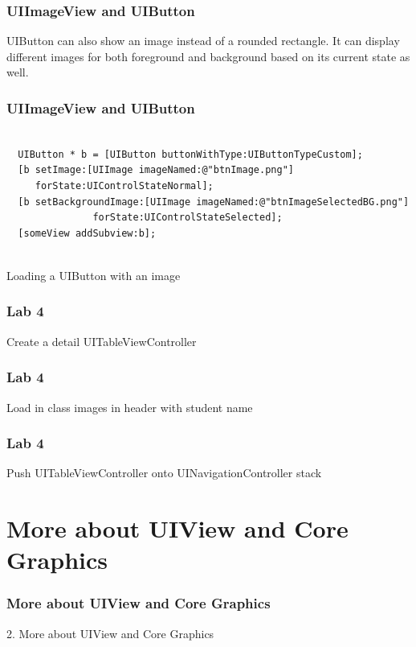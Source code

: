 \documentclass[10pt]{beamer}
\begin{document}
\begin{frame}[fragile]
  \frametitle{UIImageView and UIButton}
  UIButton can also show an image instead of a rounded rectangle.  It can display different images for both foreground and background based on its current state as well.

\end{frame}

\begin{frame}[fragile]
  \frametitle{UIImageView and UIButton}
  \begin{listing}[H]
    \begin{verbatim}
  
  UIButton * b = [UIButton buttonWithType:UIButtonTypeCustom];
  [b setImage:[UIImage imageNamed:@"btnImage.png"]
     forState:UIControlStateNormal];
  [b setBackgroundImage:[UIImage imageNamed:@"btnImageSelectedBG.png"]
               forState:UIControlStateSelected];
  [someView addSubview:b];
              
  \end{verbatim}
    \caption{Loading a UIButton with an image}
    \label{listing:28}
  \end{listing}

\end{frame}

    
\begin{frame}[fragile]
  \frametitle{Lab 4}
  Create a detail UITableViewController

\end{frame}

\begin{frame}[fragile]
  \frametitle{Lab 4}
  Load in class images in header with student name

\end{frame}

\begin{frame}[fragile]
  \frametitle{Lab 4}
  Push UITableViewController onto UINavigationController stack

\end{frame}

    

   
  

  
    
\section{More about UIView and Core Graphics}
\begin{frame}[fragile]
  \frametitle{More about UIView and Core Graphics}
  2. More about UIView and Core Graphics
\end{frame}
\end{document}

